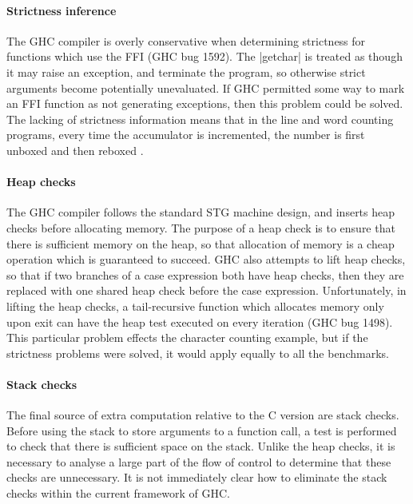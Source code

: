 \documentclass{llncs}
\begin{document}
\paragraph{Strictness inference}

The GHC compiler is overly conservative when determining strictness for functions which use the FFI (GHC bug 1592). The |getchar| is treated as though it may raise an exception, and terminate the program, so otherwise strict arguments become potentially unevaluated. If GHC permitted some way to mark an FFI function as not generating exceptions, then this problem could be solved. The lacking of strictness information means that in the line and word counting programs, every time the accumulator is incremented, the number is first unboxed and then reboxed \cite{spj:unboxing}.

\paragraph{Heap checks}

The GHC compiler follows the standard STG machine \cite{spj:implementation} design, and inserts heap checks before allocating memory. The purpose of a heap check is to ensure that there is sufficient memory on the heap, so that allocation of memory is a cheap operation which is guaranteed to succeed. GHC also attempts to lift heap checks, so that if two branches of a case expression both have heap checks, then they are replaced with one shared heap check before the case expression. Unfortunately, in lifting the heap checks, a tail-recursive function which allocates memory only upon exit can have the heap test executed on every iteration (GHC bug 1498). This particular problem effects the character counting example, but if the strictness problems were solved, it would apply equally to all the benchmarks.

\paragraph{Stack checks}

The final source of extra computation relative to the C version are stack checks. Before using the stack to store arguments to a function call, a test is performed to check that there is sufficient space on the stack. Unlike the heap checks, it is necessary to analyse a large part of the flow of control to determine that these checks are unnecessary. It is not immediately clear how to eliminate the stack checks within the current framework of GHC.
\end{document}
